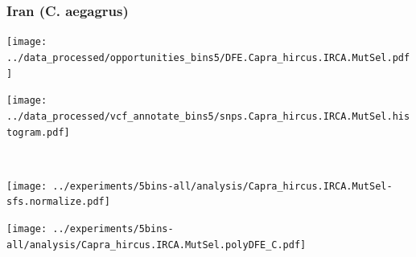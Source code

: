\subsubsection{Iran (C. aegagrus)}

\begin{minipage}{0.49\linewidth}
    \texttt{[image: ../data\_processed/opportunities\_bins5/DFE.Capra\_hircus.IRCA.MutSel.pdf]}
\end{minipage}
\begin{minipage}{0.49\linewidth}
    \texttt{[image: ../data\_processed/vcf\_annotate\_bins5/snps.Capra\_hircus.IRCA.MutSel.histogram.pdf]}
\end{minipage}
\\
\begin{minipage}{0.49\linewidth}
    \texttt{[image: ../experiments/5bins-all/analysis/Capra\_hircus.IRCA.MutSel-sfs.normalize.pdf]}
\end{minipage}
\begin{minipage}{0.4\linewidth}
    \texttt{[image: ../experiments/5bins-all/analysis/Capra\_hircus.IRCA.MutSel.polyDFE\_C.pdf]}
\end{minipage}
